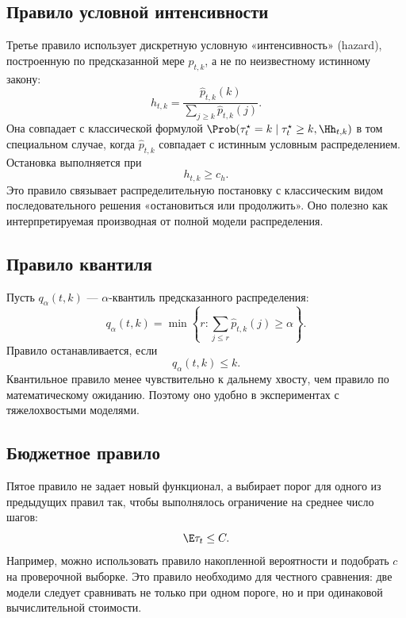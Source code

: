 \subsection{Правило условной интенсивности}

Третье правило использует дискретную условную «интенсивность» (hazard), построенную по предсказанной мере \(\widehat p_{t,k}\), а не по неизвестному истинному закону:
\begin{equation}
  h_{t,k}
  =\frac{\widehat p_{t,k}(k)}{\sum_{j\ge k}\widehat p_{t,k}(j)}.
  \label{eq:hazard_rule}
\end{equation}
Она совпадает с классической формулой \(\Prob(\tau_t^\star=k\mid \tau_t^\star\ge k,\Hh_{t,k})\) в том специальном случае, когда \(\widehat p_{t,k}\) совпадает с истинным условным распределением.
Остановка выполняется при
\begin{equation}
  h_{t,k}\ge c_h.
  \label{eq:hazard_threshold}
\end{equation}
Это правило связывает распределительную постановку с классическим видом последовательного решения «остановиться или продолжить». Оно полезно как интерпретируемая производная от полной модели распределения.

\subsection{Правило квантиля}

Пусть \(q_\alpha(t,k)\) --- \(\alpha\)-квантиль предсказанного распределения:
\begin{equation}
  q_\alpha(t,k)=\min\left\{r:\sum_{j\le r}\widehat p_{t,k}(j)\ge \alpha\right\}.
  \label{eq:quantile}
\end{equation}
Правило останавливается, если
\begin{equation}
  q_\alpha(t,k)\le k.
  \label{eq:quantile_rule}
\end{equation}
Квантильное правило менее чувствительно к дальнему хвосту, чем правило по математическому ожиданию. Поэтому оно удобно в экспериментах с тяжелохвостыми моделями.

\subsection{Бюджетное правило}

Пятое правило не задает новый функционал, а выбирает порог для одного из предыдущих правил так, чтобы выполнялось ограничение на среднее число шагов:
\begin{equation}
  \E\tau_t\le C.
  \label{eq:budget_constraint}
\end{equation}
Например, можно использовать правило накопленной вероятности и подобрать \(c\) на проверочной выборке. Это правило необходимо для честного сравнения: две модели следует сравнивать не только при одном пороге, но и при одинаковой вычислительной стоимости.

